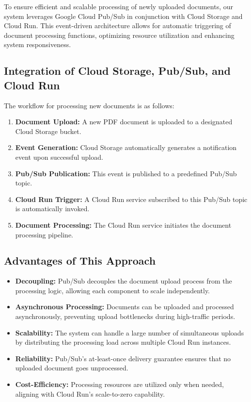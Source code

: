 \documentclass[a4paper, 12pt]{report}
\begin{document}
To ensure efficient and scalable processing of newly uploaded documents, our system leverages Google Cloud Pub/Sub in conjunction with Cloud Storage and Cloud Run. This event-driven architecture allows for automatic triggering of document processing functions, optimizing resource utilization and enhancing system responsiveness.

\subsection{Integration of Cloud Storage, Pub/Sub, and Cloud Run}

The workflow for processing new documents is as follows:

\begin{enumerate}
    \item \textbf{Document Upload:} A new PDF document is uploaded to a designated Cloud Storage bucket.
    \item \textbf{Event Generation:} Cloud Storage automatically generates a notification event upon successful upload.
    \item \textbf{Pub/Sub Publication:} This event is published to a predefined Pub/Sub topic.
    \item \textbf{Cloud Run Trigger:} A Cloud Run service subscribed to this Pub/Sub topic is automatically invoked.
    \item \textbf{Document Processing:} The Cloud Run service initiates the document processing pipeline.
\end{enumerate}

\subsection{Advantages of This Approach}

\begin{itemize}
    \item \textbf{Decoupling:} Pub/Sub decouples the document upload process from the processing logic, allowing each component to scale independently.
    \item \textbf{Asynchronous Processing:} Documents can be uploaded and processed asynchronously, preventing upload bottlenecks during high-traffic periods.
    \item \textbf{Scalability:} The system can handle a large number of simultaneous uploads by distributing the processing load across multiple Cloud Run instances.
    \item \textbf{Reliability:} Pub/Sub's at-least-once delivery guarantee ensures that no uploaded document goes unprocessed.
    \item \textbf{Cost-Efficiency:} Processing resources are utilized only when needed, aligning with Cloud Run's scale-to-zero capability.
\end{itemize}
\end{document}

